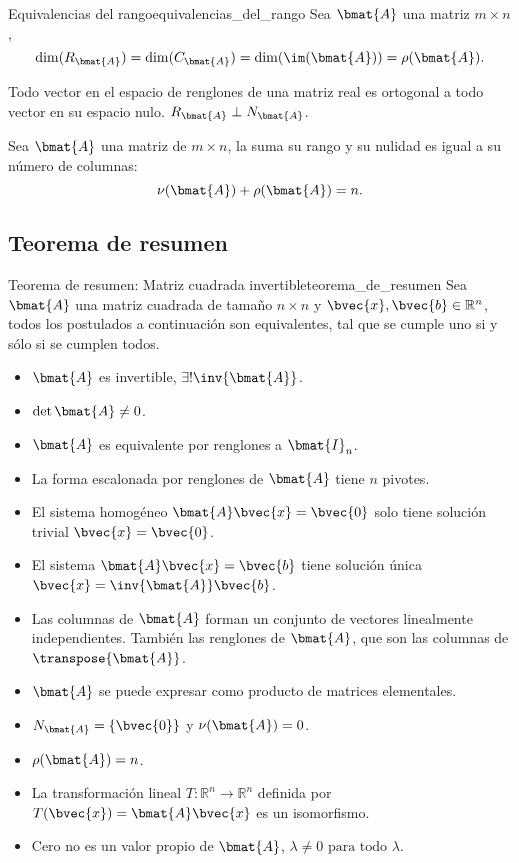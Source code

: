 \documentclass{fmbnotes}
\begin{document}
\begin{teorema}{Equivalencias del rango}{equivalencias_del_rango}
	Sea \(\bmat{A}\) una matriz \(m \times n \), 
	\[\dim(R_{\bmat{A}})=\dim(C_{\bmat{A}})=\dim(\im(\bmat{A}))=\rho(\bmat{A}).\]
\end{teorema}

Todo vector en el espacio de renglones de una matriz real es ortogonal a todo vector en su espacio nulo. \(R_{\bmat{A}} \perp N_{\bmat{A}}\).

\begin{teorema}{}{}
Sea \(\bmat{A}\) una matriz de \(m\times n \), la suma su rango y su nulidad es igual a su número de columnas:
\[\nu(\bmat{A})+\rho(\bmat{A})=n.\]
\end{teorema}

\subsection{Teorema de resumen}

\begin{teorema}{Teorema de resumen: Matriz cuadrada invertible}{teorema_de_resumen}
	Sea \(\bmat{A}\) una matriz cuadrada de tamaño \(n \times n\) y \(\bvec{x},\bvec{b} \in \mathbb{R}^{n}\), todos los postulados a continuación son equivalentes, tal que se cumple uno si y sólo si se cumplen todos.
	\begin{itemize}
	\item \(\bmat{A}\) es invertible, \( \exists! \inv{\bmat{A}} \).
	\item \(\det \bmat{A} \neq 0\).
	\item \(\bmat{A}\) es equivalente por renglones a \(\bmat{I}_n\).
	\item La forma escalonada por renglones de \(\bmat{A}\) tiene \(n\) pivotes. 
	\item El sistema homogéneo \(\bmat{A}\bvec{x}=\bvec{0}\) solo tiene solución trivial \(\bvec{x}=\bvec{0}\).  
	\item El sistema \(\bmat{A}\bvec{x}=\bvec{b}\) tiene solución única \(\bvec{x}=\inv{\bmat{A}}\bvec{b}\).
	\item Las columnas de \(\bmat{A}\) forman un conjunto de vectores linealmente independientes. También las renglones de \(\bmat{A}\), que son las columnas de \(\transpose{\bmat{A}}\).
	\item \(\bmat{A}\) se puede expresar como producto de matrices elementales.
	\item \(N_{\bmat{A}}=\{\bvec{0}\}\) y \( \nu(\bmat{A}) = 0 \).
	\item \( \rho(\bmat{A})=n \).
	\item La transformación lineal \(T\colon\mathbb{R}^{n}\to\mathbb{R}^{n}\) definida por \(T(\bvec{x})=\bmat{A}\bvec{x}\) es un isomorfismo.
	\item Cero no es un valor propio de \(\bmat{A}\), \(\lambda \neq 0 \text{ para todo } \lambda\).  
	\end{itemize} 
\end{teorema}
\end{document}
